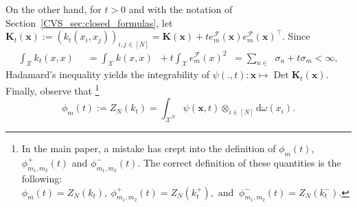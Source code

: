 \documentclass[twoside,11pt]{book}
\numberwithin{theorem}{chapter}
\numberwithin{definition}{chapter}
\numberwithin{proposition}{chapter}
\numberwithin{corollary}{chapter}
\numberwithin{example}{chapter}
\numberwithin{lemma}{chapter}
\numberwithin{assumption}{chapter}
\DeclareMathOperator{\Det}{Det}
\DeclareMathOperator{\Tran}{\intercal}
\DeclareMathOperator{\F}{\mathcal{F}}
\DeclareMathOperator{\X}{\mathcal{X}}
\DeclareMathOperator{\Mu}{\mathrm{d}\omega(x)}
\DeclareMathOperator{\Ns}{\mathbb{N}^{*}}
\begin{document}
On the other hand, for $t>0$ and with the notation of Section~\ref{CVS_sec:closed_formulas}, let $ \bm{K}_{t}(\bm{x}) := (k_{t}(x_{i},x_{j}))_{i,j \in [N]} = \bm{K}(\bm{x})+t e_{m}^{\mathcal{F}}(\bm{x})e_{m}^{\mathcal{F}}(\bm{x})^{\Tran}$.
Since
\begin{align}
\int_{\X} k_{t}(x,x) \Mu
& = \int_{\X} k(x,x) \Mu + t \int_{\X} e_{m}^{\F}(x)^{2} \Mu = \sum\limits_{n \in \Ns} \sigma_{n} + t \sigma_{m} < \infty,
\end{align}
Hadamard's inequality yields the integrability of
$
\psi(.,t): \bm{x} \mapsto \Det \bm{K}_{t}(\bm{x}).
$
Finally, observe that \footnote{In the main paper, a mistake has crept into the definition of $\phi_{m}(t)$, $\phi_{m_{1},m_{2}}^{+}(t)$ and $\phi_{m_{1},m_{2}}^{-}(t)$. The correct definition of these quantities is the following: $
\phi_{m}(t) = Z_{N}(k_{t}) , \: \phi_{m_{1},m_{2}}^{+}(t) = Z_{N}(k_{t}^{+}),  \text{ and }\: \phi_{m_{1},m_{2}}^{-}(t) = Z_{N}(k_{t}^{-}). $}
\begin{equation}
\phi_{m}(t) := Z_N(k_t) =  \int_{\X^{N}} \psi(\bm{x},t) \otimes_{i \in [N]} \mathrm{d}\omega(x_{i}).
\end{equation}
\end{document}
